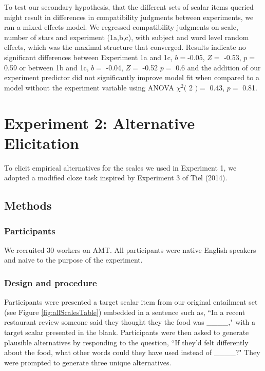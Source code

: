 \documentclass[10pt, letterpaper]{article}
\begin{document}
To test our secondary hypothesis, that the different sets of scalar
items queried might result in differences in compatibility judgments
between experiments, we ran a mixed effects model. We regressed
compatibility judgments on scale, number of stars and experiment
(1a,b,c), with subject and word level random effects, which was the
maximal structure that converged. Results indicate no significant
differences between Experiment 1a and 1c, \(b =\)-0.05, \(Z =\) -0.53,
\(p =\) 0.59 or between 1b and 1c, \(b =\) -0.04, \(Z =\) -0.52 \(p =\)
0.6 and the addition of our experiment predictor did not significantly
improve model fit when compared to a model without the experiment
variable using ANOVA \(\chi^2(\) 2 \() =\) 0.43, \(p =\) 0.81.

\section{Experiment 2: Alternative
Elicitation}\label{experiment-2-alternative-elicitation}

To elicit empirical alternatives for the scales we used in Experiment 1,
we adopted a modified cloze task inspired by Experiment 3 of Tiel
(2014).

\subsection{Methods}\label{methods-1}

\subsubsection{Participants}\label{participants-1}

We recruited 30 workers on AMT. All participants were native English
speakers and naive to the purpose of the experiment.

\subsubsection{Design and procedure}\label{design-and-procedure-1}

Participants were presented a target scalar item from our original
entailment set (see Figure \ref{fig:allScalesTable}) embedded in a
sentence such as, ``In a recent restaurant review someone said they
thought they the food was \_\_\_\_," with a target scalar presented in
the blank. Participants were then asked to generate plausible
alternatives by responding to the question, ``If they'd felt differently
about the food, what other words could they have used instead of
\_\_\_\_?" They were prompted to generate three unique alternatives.
\end{document}
